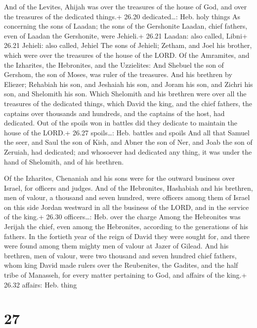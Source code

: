  And of the Levites, Ahijah was over the treasures of the
house of God, and over the treasures of the dedicated things.+ 26.20
dedicated\ldots: Heb. holy things  As concerning the sons
of Laadan; the sons of the Gershonite Laadan, chief fathers, even of
Laadan the Gershonite, were Jehieli.+ 26.21 Laadan: also called, Libni+
26.21 Jehieli: also called, Jehiel  The sons of Jehieli;
Zetham, and Joel his brother, which were over the treasures of the house
of the LORD.  Of the Amramites, and the Izharites, the
Hebronites, and the Uzzielites:  And Shebuel the son of
Gershom, the son of Moses, was ruler of the treasures.  And
his brethren by Eliezer; Rehabiah his son, and Jeshaiah his son, and
Joram his son, and Zichri his son, and Shelomith his son. 
Which Shelomith and his brethren were over all the treasures of the
dedicated things, which David the king, and the chief fathers, the
captains over thousands and hundreds, and the captains of the host, had
dedicated.  Out of the spoils won in battles did they
dedicate to maintain the house of the LORD.+ 26.27 spoils\ldots: Heb.
battles and spoils  And all that Samuel the seer, and Saul
the son of Kish, and Abner the son of Ner, and Joab the son of Zeruiah,
had dedicated; and whosoever had dedicated any thing, it was under the
hand of Shelomith, and of his brethren.

 Of the Izharites, Chenaniah and his sons were for the
outward business over Israel, for officers and judges.  And
of the Hebronites, Hashabiah and his brethren, men of valour, a thousand
and seven hundred, were officers among them of Israel on this side
Jordan westward in all the business of the LORD, and in the service of
the king.+ 26.30 officers\ldots: Heb. over the charge 
Among the Hebronites was Jerijah the chief, even among the Hebronites,
according to the generations of his fathers. In the fortieth year of the
reign of David they were sought for, and there were found among them
mighty men of valour at Jazer of Gilead.  And his brethren,
men of valour, were two thousand and seven hundred chief fathers, whom
king David made rulers over the Reubenites, the Gadites, and the half
tribe of Manasseh, for every matter pertaining to God, and affairs of
the king.+ 26.32 affairs: Heb. thing

\hypertarget{section-26}{%
\section{27}\label{section-26}}


